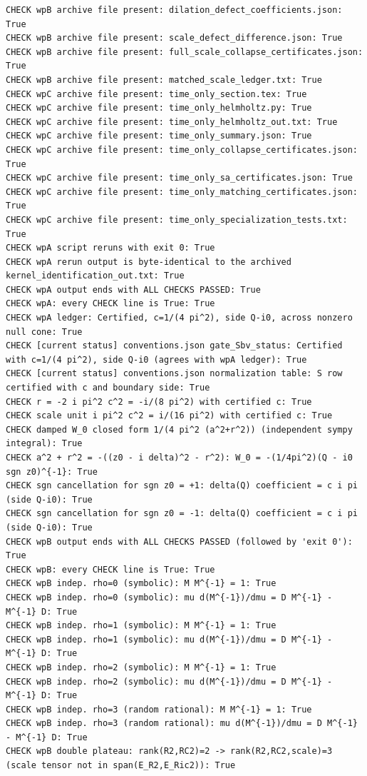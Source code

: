 \documentclass{article}
\theoremstyle{remark}
\begin{document}
\begin{lstlisting}
CHECK wpB archive file present: dilation_defect_coefficients.json: True
CHECK wpB archive file present: scale_defect_difference.json: True
CHECK wpB archive file present: full_scale_collapse_certificates.json: True
CHECK wpB archive file present: matched_scale_ledger.txt: True
CHECK wpC archive file present: time_only_section.tex: True
CHECK wpC archive file present: time_only_helmholtz.py: True
CHECK wpC archive file present: time_only_helmholtz_out.txt: True
CHECK wpC archive file present: time_only_summary.json: True
CHECK wpC archive file present: time_only_collapse_certificates.json: True
CHECK wpC archive file present: time_only_sa_certificates.json: True
CHECK wpC archive file present: time_only_matching_certificates.json: True
CHECK wpC archive file present: time_only_specialization_tests.txt: True
CHECK wpA script reruns with exit 0: True
CHECK wpA rerun output is byte-identical to the archived kernel_identification_out.txt: True
CHECK wpA output ends with ALL CHECKS PASSED: True
CHECK wpA: every CHECK line is True: True
CHECK wpA ledger: Certified, c=1/(4 pi^2), side Q-i0, across nonzero null cone: True
CHECK [current status] conventions.json gate_Sbv_status: Certified with c=1/(4 pi^2), side Q-i0 (agrees with wpA ledger): True
CHECK [current status] conventions.json normalization table: S row certified with c and boundary side: True
CHECK r = -2 i pi^2 c^2 = -i/(8 pi^2) with certified c: True
CHECK scale unit i pi^2 c^2 = i/(16 pi^2) with certified c: True
CHECK damped W_0 closed form 1/(4 pi^2 (a^2+r^2)) (independent sympy integral): True
CHECK a^2 + r^2 = -((z0 - i delta)^2 - r^2): W_0 = -(1/4pi^2)(Q - i0 sgn z0)^{-1}: True
CHECK sgn cancellation for sgn z0 = +1: delta(Q) coefficient = c i pi (side Q-i0): True
CHECK sgn cancellation for sgn z0 = -1: delta(Q) coefficient = c i pi (side Q-i0): True
CHECK wpB output ends with ALL CHECKS PASSED (followed by 'exit 0'): True
CHECK wpB: every CHECK line is True: True
CHECK wpB indep. rho=0 (symbolic): M M^{-1} = 1: True
CHECK wpB indep. rho=0 (symbolic): mu d(M^{-1})/dmu = D M^{-1} - M^{-1} D: True
CHECK wpB indep. rho=1 (symbolic): M M^{-1} = 1: True
CHECK wpB indep. rho=1 (symbolic): mu d(M^{-1})/dmu = D M^{-1} - M^{-1} D: True
CHECK wpB indep. rho=2 (symbolic): M M^{-1} = 1: True
CHECK wpB indep. rho=2 (symbolic): mu d(M^{-1})/dmu = D M^{-1} - M^{-1} D: True
CHECK wpB indep. rho=3 (random rational): M M^{-1} = 1: True
CHECK wpB indep. rho=3 (random rational): mu d(M^{-1})/dmu = D M^{-1} - M^{-1} D: True
CHECK wpB double plateau: rank(R2,RC2)=2 -> rank(R2,RC2,scale)=3 (scale tensor not in span(E_R2,E_Ric2)): True

\end{lstlisting}
\end{document}
